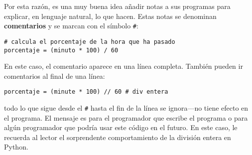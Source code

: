 Por esta razón, es una muy buena idea añadir notas a sus programas
para explicar, en lenguaje natural, lo que hacen. Estas notas se denominan
\textbf{comentarios }y se marcan con el símbolo \texttt{\#}:

\begin{lstlisting}
# calcula el porcentaje de la hora que ha pasado
porcentaje = (minuto * 100) / 60
\end{lstlisting}
 En este caso, el comentario aparece en una línea completa. También
pueden ir comentarios al final de una línea:

\begin{lstlisting}
porcentaje = (minute * 100) // 60 # div entera
\end{lstlisting}

todo lo que sigue desde el \texttt{\#} hasta el fin de la línea se
ignora—no tiene efecto en el programa. El mensaje es para el programador
que escribe el programa o para algún programador que podría usar este
código en el futuro. En este caso, le recuerda al lector el sorprendente
comportamiento de la división entera en Python.

